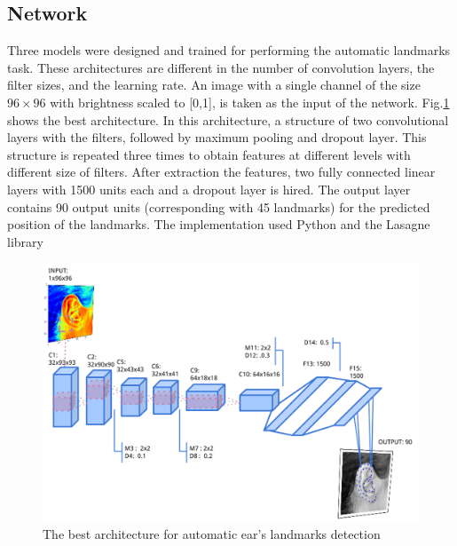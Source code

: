 \subsection{Network}
Three models were designed and trained for performing the automatic landmarks task.  These architectures are different in the number of convolution layers, the filter sizes, and the learning rate. An image with a single channel of the size  $96 \times 96$ with brightness scaled to [0,1], is taken as the input of the network. Fig.\ref{1Econv} shows the best architecture. In this architecture, a structure of two convolutional layers with the filters, followed by maximum pooling and dropout layer. This structure is repeated three times to obtain features at different levels with different size of filters. After extraction the features, two fully connected linear layers with 1500 units each and a dropout layer is hired. The output layer contains 90 output units (corresponding with 45 landmarks) for the predicted position of the landmarks. The implementation used Python and the Lasagne library \cite{}
\begin{figure}[h!]
	\centering
	\includegraphics[scale=0.27]{images/ear_cnn}
	\caption{The best architecture for automatic ear's landmarks detection}
	\label{1Econv}
\end{figure}
